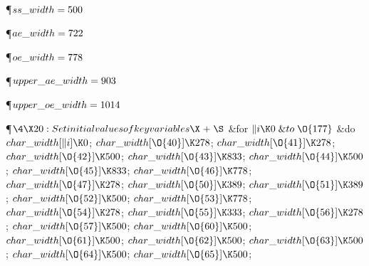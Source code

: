 \Y\P\D {}$\\{ss\_width}=500$%
\par
\P\D {}$\\{ae\_width}=722$\par
\P\D {}$\\{oe\_width}=778$\par
\P\D {}$\\{upper\_ae\_width}=903$\par
\P\D {}$\\{upper\_oe\_width}=1014$\par
\Y\P$\4\X20:Set initial values of key variables\X\mathrel{+}\S$\6
\&{for} $\|i\K0\mathrel{\&{to}}\O{177}$ \1\&{do}\5
$\\{char\_width}[\|i]\K0$;\2\6
$\\{char\_width}[\O{40}]\K278$;\5
$\\{char\_width}[\O{41}]\K278$;\5
$\\{char\_width}[\O{42}]\K500$;\5
$\\{char\_width}[\O{43}]\K833$;\5
$\\{char\_width}[\O{44}]\K500$;\5
$\\{char\_width}[\O{45}]\K833$;\5
$\\{char\_width}[\O{46}]\K778$;\5
$\\{char\_width}[\O{47}]\K278$;\5
$\\{char\_width}[\O{50}]\K389$;\5
$\\{char\_width}[\O{51}]\K389$;\5
$\\{char\_width}[\O{52}]\K500$;\5
$\\{char\_width}[\O{53}]\K778$;\5
$\\{char\_width}[\O{54}]\K278$;\5
$\\{char\_width}[\O{55}]\K333$;\5
$\\{char\_width}[\O{56}]\K278$;\5
$\\{char\_width}[\O{57}]\K500$;\5
$\\{char\_width}[\O{60}]\K500$;\5
$\\{char\_width}[\O{61}]\K500$;\5
$\\{char\_width}[\O{62}]\K500$;\5
$\\{char\_width}[\O{63}]\K500$;\5
$\\{char\_width}[\O{64}]\K500$;\5
$\\{char\_width}[\O{65}]\K500$;\5
